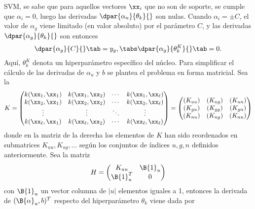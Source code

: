 SVM, se sabe que para aquellos vectores $\xx_i$ que no son de soporte,
se cumple que $\alpha_i=0$, luego las derivadas
$\dpar{\alpha_n}{\theta_k}{}$ son nulas. Cuando
$\alpha_i=\pm{}C$, el valor de $\alpha_g$ viene limitado (en valor absoluto) por el
parámetro $C$, y las derivadas $\dpar{\alpha_g}{\theta_k}{}$ son entonces
%
\begin{align}
  \dpar{\alpha_g}{C}{} \tab= y_g, \tabs \dpar{\alpha_g}{{\theta}^K_k}{} \tab= 0.
\end{align}
%
Aquí, $\theta_k^K$ denota un hiperparámetro específico del núcleo.
Para simplificar el cálculo de las derivadas de $\alpha_u$ y $b$ se
plantea el problema en forma matricial. Sea la 
%
\begin{align}
  K = \begin{pmatrix} k(\xx_1,\xx_1) & k(\xx_1,\xx_2) & \cdots & k(\xx_1,\xx_\ell)
    \\ k(\xx_2,\xx_1) & k(\xx_2,\xx_2) & \cdots & k(\xx_2,\xx_\ell) \\ \vdots &
    \vdots & \ddots & \vdots \\ k(\xx_\ell,\xx_1) & k(\xx_\ell,\xx_2) & \cdots &
    k(\xx_\ell,\xx_\ell)
  \end{pmatrix}
  =
  \begin{pmatrix}
    (K_{uu}) & (K_{ug}) & (K_{un}) \\
    (K_{gu}) & (K_{gg}) & (K_{gn}) \\
    (K_{nu}) & (K_{ng}) & (K_{nn})
  \end{pmatrix}
\end{align}
%
donde en la matriz de la derecha los elementos de $K$ han sido
reordenados en submatrices $K_{uu},K_{ug},\ldots$ según los conjuntos
de índices $u, g, n$ definidos anteriormente.  Sea la matriz
%
\begin{align}
  H=\begin{pmatrix} K_{uu} & \B{1}_u \\ \B{1}_u^T & 0
  \end{pmatrix}
\end{align}
%
con $\B{1}_u$ un vector columna de $|u|$ elementos iguales a 1,
entonces la derivada de $(\B{\alpha}_u,b)^T$ respecto del
hiperparámetro $\theta_k$ viene dada por
%
